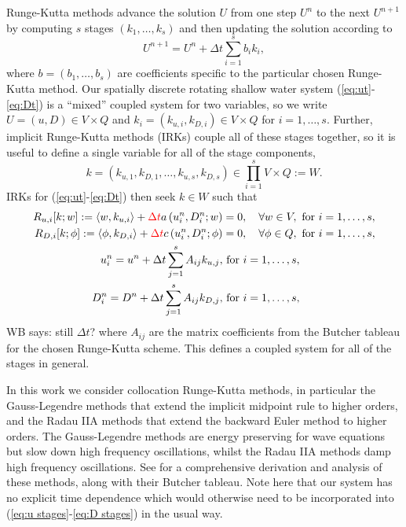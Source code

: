 \documentclass[a4paper, 12pt]{article}
\newcommand{\checkit}[1]{{\color{red}#1}}
\newcommand{\werner}[1]{{\color{magenta}WB says: #1}}
\begin{document}
Runge-Kutta methods advance the solution $U$ from one step $U^n$ to
the next $U^{n+1}$ by computing $s$ stages $(k_1,\ldots,k_s)$ and then
updating the solution according to
\begin{equation}
  U^{n+1} = U^n + \Delta t\sum_{i=1}^s b_i k_i,
\end{equation}
where $b=(b_1,\ldots, b_s)$ are coefficients specific to the
particular chosen Runge-Kutta method. Our spatially discrete rotating
shallow water system (\ref{eq:ut}-\ref{eq:Dt}) is a ``mixed'' coupled
system for two variables, so we write $U=(u,D)\in V\times Q$ and $k_i
= (k_{u,i},k_{D,i})\in V\times Q$ for $i=1,\ldots,s$. Further,
implicit Runge-Kutta methods (IRKs) couple all of these stages together, so it
is useful to define a single variable for all of the stage components,
\[
k = (k_{u,1},k_{D,1},\ldots,k_{u,s},k_{D,s}) \in
\prod_{i=1}^s V\times Q := W.
\]
IRKs for (\ref{eq:ut}-\ref{eq:Dt}) then 
seek $k\in W$ such that
\begin{align}
    \label{eq:u stages}
    R_{u,i}[k;w] := \langle w, k_{u,i} \rangle + \checkit{\Delta t} a\left(
    u^n_i,D^n_i;w\right)
  & = 0,  
  \quad \forall w \in V,\mbox{ for }i=1,\ldots,s, \\
  \label{eq:D stages}
  R_{D,i}[k;\phi] := \langle \phi, k_{D,i} \rangle + \checkit{\Delta t} c\left(u^n_i,D^n_i; \phi\right)
  & = 0, \quad \forall \phi \in Q, \mbox{ for }i=1,\ldots,s,\\
  u^n_i = u^n + \Delta t\sum_{j=1}^sA_{ij}k_{u,j}, & \mbox{ for }i=1,\ldots,s,\\
  D^n_i = D^n + \Delta t\sum_{j=1}^sA_{ij}k_{D,j}, & \mbox{ for }i=1,\ldots,s,
\end{align}
\werner{still $\Delta t$?}
where $A_{ij}$ are the matrix coefficients from the Butcher
tableau for the chosen Runge-Kutta scheme. This defines a coupled
system for all of the stages in general.

In this work
we consider collocation Runge-Kutta methods, in particular the
Gauss-Legendre methods that extend the implicit midpoint rule to
higher orders, and the Radau IIA methods that extend the backward Euler
method to higher orders. The Gauss-Legendre methods are energy
preserving for wave equations but slow down high frequency
oscillations, whilst the Radau IIA methods damp high frequency
oscillations.  See \citet{wanner1996solving} for a comprehensive
derivation and analysis of these methods, along with their Butcher
tableau. Note here that our system has no explicit time dependence
which would otherwise need to be incorporated into (\ref{eq:u
  stages}-\ref{eq:D stages}) in the usual way.
\end{document}
